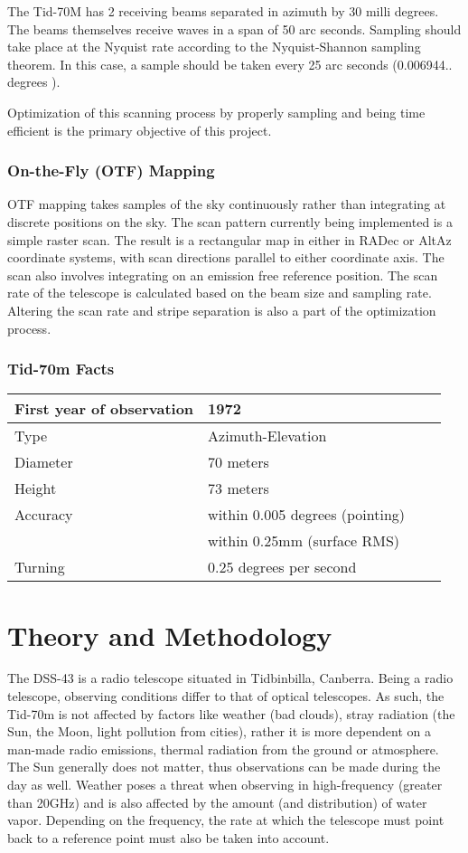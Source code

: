 \documentclass{article}%
\begin{document}
The Tid-70M has 2 receiving beams separated in azimuth by 30 milli degrees. The beams themselves receive waves in a span of 50 arc seconds. Sampling should take place at the Nyquist rate according to the Nyquist-Shannon sampling theorem. In this case, a sample should be taken every 25 arc seconds (0.006944.. degrees ).

Optimization of this scanning process by properly sampling and being time efficient is the primary objective of this project.
\subsubsection{On-the-Fly (OTF) Mapping}

OTF mapping takes samples of the sky continuously rather than integrating at discrete positions on the sky. The scan pattern currently being implemented is a simple raster scan. The result is a rectangular map in either in RADec or AltAz coordinate systems, with scan directions parallel to either coordinate axis. The scan also involves integrating on an emission free reference position. The scan rate of the telescope is calculated based on the beam size and sampling rate. Altering the scan rate and stripe separation is also a part of the optimization process. 

\subsubsection{Tid-70m Facts}
\begin{tabular}{lllr}
\hline
\hline
First year of observation & 1972\\
\hline
Type	&Azimuth-Elevation\\
\hline
Diameter &70 meters\\
\hline
Height &73 meters\\
\hline
Accuracy &within 0.005 degrees (pointing)\\
&within 0.25mm (surface RMS)\\
\hline
Turning &0.25 degrees per second\\
\end{tabular}

\newpage
\section{Theory and Methodology}
The DSS-43 is a radio telescope situated in Tidbinbilla, Canberra. Being a radio telescope, observing conditions differ to that of optical telescopes. As such, the Tid-70m is not affected by factors like weather (bad clouds), stray radiation (the Sun, the Moon, light pollution from cities), rather it is more dependent on a man-made radio emissions, thermal radiation from the ground or atmosphere. The Sun generally does not matter, thus observations can be made during the day as well. Weather poses a threat when observing in high-frequency (greater than 20GHz) and is also affected by the amount (and distribution) of water vapor. Depending on the frequency, the rate at which the telescope must point back to a reference point must also be taken into account.
\end{document}
